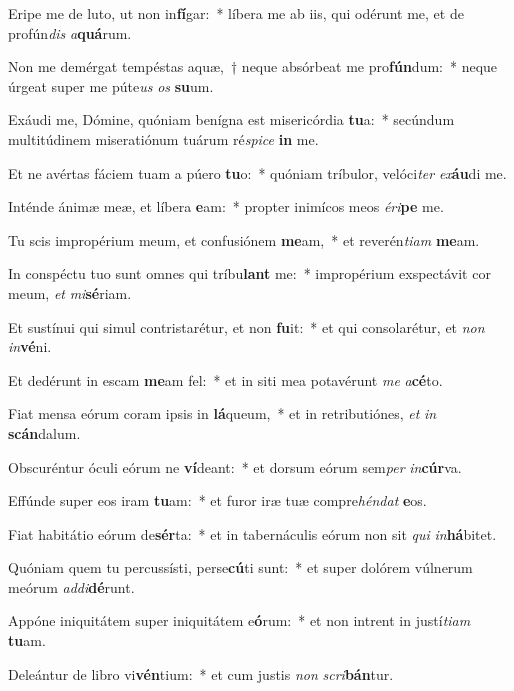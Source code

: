 \item Eripe me de luto, ut non in\textbf{fí}gar:~* líbera me ab iis, qui odérunt me, et de profún\textit{dis} \textit{a}\textbf{quá}rum.
\item Non me demérgat tempéstas aquæ,~† neque absórbeat me pro\textbf{fún}dum:~* neque úrgeat super me púte\textit{us} \textit{os} \textbf{su}um.
\item Exáudi me, Dómine, quóniam benígna est misericórdia \textbf{tu}a:~* secúndum multitúdinem miseratiónum tuárum ré\textit{spi}\textit{ce} \textbf{in} me.
\item Et ne avértas fáciem tuam a púero \textbf{tu}o:~* quóniam tríbulor, velóci\textit{ter} \textit{ex}\textbf{áu}di me.
\item Inténde ánimæ meæ, et líbera \textbf{e}am:~* propter inimícos meos \textit{é}\textit{ri}\textbf{pe} me.
\item Tu scis impropérium meum, et confusiónem \textbf{me}am,~* et reverén\textit{ti}\textit{am} \textbf{me}am.
\item In conspéctu tuo sunt omnes qui tríbu\textbf{lant} me:~* impropérium exspectávit cor meum, \textit{et} \textit{mi}\textbf{sé}riam.
\item Et sustínui qui simul contristarétur, et non \textbf{fu}it:~* et qui consolarétur, et \textit{non} \textit{in}\textbf{vé}ni.
\item Et dedérunt in escam \textbf{me}am fel:~* et in siti mea potavérunt \textit{me} \textit{a}\textbf{cé}to.
\item Fiat mensa eórum coram ipsis in \textbf{lá}queum,~* et in retributiónes, \textit{et} \textit{in} \textbf{scán}dalum.
\item Obscuréntur óculi eórum ne \textbf{ví}deant:~* et dorsum eórum sem\textit{per} \textit{in}\textbf{cúr}va.
\item Effúnde super eos iram \textbf{tu}am:~* et furor iræ tuæ compre\textit{hén}\textit{dat} \textbf{e}os.
\item Fiat habitátio eórum de\textbf{sér}ta:~* et in tabernáculis eórum non sit \textit{qui} \textit{in}\textbf{há}bitet.
\item Quóniam quem tu percussísti, perse\textbf{cú}ti sunt:~* et super dolórem vúlnerum meórum \textit{ad}\textit{di}\textbf{dé}runt.
\item Appóne iniquitátem super iniquitátem e\textbf{ó}rum:~* et non intrent in justí\textit{ti}\textit{am} \textbf{tu}am.
\item Deleántur de libro vi\textbf{vén}tium:~* et cum justis \textit{non} \textit{scri}\textbf{bán}tur.
